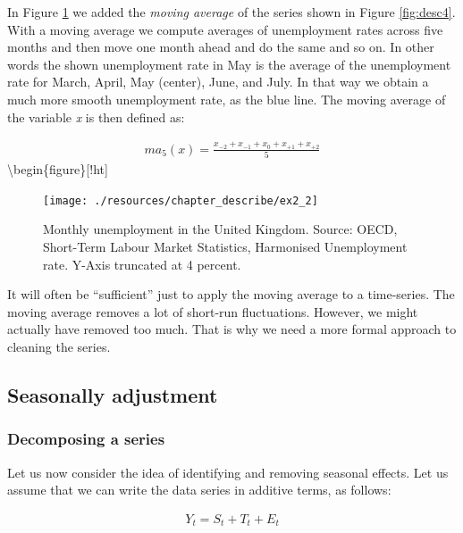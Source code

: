 \documentclass[
]{book}
\begin{document}
In Figure \ref{fig:desc5} we added the \emph{moving average} of the series shown in Figure \ref{fig:desc4}. With a moving average we compute averages of unemployment rates across five months and then move one month ahead and do the same and so on. In other words the shown unemployment rate in May is the average of the unemployment rate for March, April, May (center), June, and July. In that way we obtain a much more smooth unemployment rate, as the blue line. The moving average of the variable \emph{x} is then defined as:

\begin{align}
    ma_{5}(x)=\frac{x_{-2}+x_{-1}+x_{0}+x_{+1}+x_{+2}}{5}
  \end{align}
\textbackslash begin\{figure\}{[}!ht{]}

\begin{figure}

{\centering \texttt{[image: ./resources/chapter\_describe/ex2\_2]} 

}

\caption{Monthly unemployment in the United Kingdom. Source: OECD, Short-Term Labour Market Statistics, Harmonised Unemployment rate.  Y-Axis truncated at 4 percent.}\label{fig:desc5}
\end{figure}

It will often be ``sufficient'' just to apply the moving average to a time-series. The moving average removes a lot of short-run fluctuations. However, we might actually have removed too much. That is why we need a more formal approach to cleaning the series.

\hypertarget{seasonally-adjustment}{%
\subsection*{Seasonally adjustment}\label{seasonally-adjustment}}

\hypertarget{decomposing-a-series}{%
\subsubsection*{Decomposing a series}\label{decomposing-a-series}}

Let us now consider the idea of identifying and removing seasonal effects. Let us assume that we can write the data series in additive terms, as follows:

\begin{align}
  Y_t=S_t+T_t+E_t
\end{align}
\end{document}
